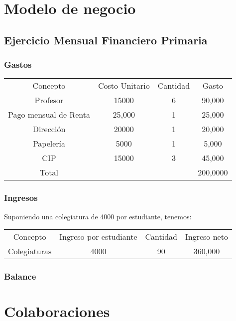 \documentclass[10pt,letterpaper]{book}
\begin{document}
\chapter{Modelo de negocio}

\section{Ejercicio Mensual Financiero Primaria}

\subsection{Gastos}
\begin{center}
\begin{tabular}{cccc}
Concepto & Costo Unitario & Cantidad & Gasto \\ 
Profesor & 15000 & 6 & 90,000 \\ 
Pago mensual de Renta & 25,000 & 1 & 25,000 \\ 
Dirección & 20000 & 1 & 20,000 \\
Papelería & 5000 & 1 & 5,000 \\
CIP & 15000 & 3 & 45,000 \\
Total &  &  & 200,0000 \\
\end{tabular} 
\end{center}

\subsection{Ingresos}
Suponiendo una colegiatura de 4000 por estudiante, tenemos:\\
\begin{center}
\begin{tabular}{cccc}

Concepto & Ingreso por estudiante & Cantidad & Ingreso neto \\ 

Colegiaturas & 4000 & 90 & 360,000 \\ 

\end{tabular} 
\end{center}

\subsection{Balance}

\chapter{Colaboraciones}
\end{document}
